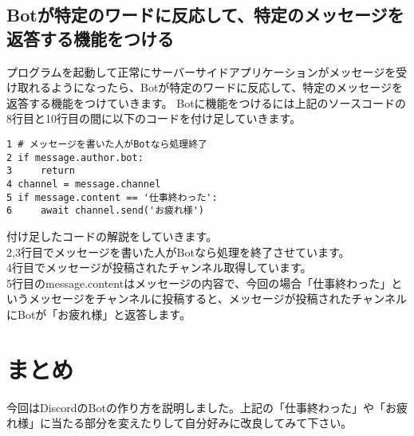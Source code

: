\subsection{Botが特定のワードに反応して、特定のメッセージを返答する機能をつける}
プログラムを起動して正常にサーバーサイドアプリケーションがメッセージを受け取れるようになったら、Botが特定のワードに反応して、特定のメッセージを返答する機能をつけていきます。
Botに機能をつけるには上記のソースコードの8行目と10行目の間に以下のコードを付け足していきます。\\
\begin{tcolorbox}[breakable]
\begin{verbatim}
1 # メッセージを書いた人がBotなら処理終了
2 if message.author.bot:
3     return
4 channel = message.channel 
5 if message.content == '仕事終わった':
6     await channel.send('お疲れ様')
\end{verbatim}
\end{tcolorbox}
付け足したコードの解説をしていきます。\\
2,3行目でメッセージを書いた人がBotなら処理を終了させています。\\
4行目でメッセージが投稿されたチャンネル取得しています。\\
5行目のmessage.contentはメッセージの内容で、今回の場合「仕事終わった」というメッセージをチャンネルに投稿すると、メッセージが投稿されたチャンネルにBotが「お疲れ様」と返答します。
\section{まとめ}
今回はDiscordのBotの作り方を説明しました。上記の「仕事終わった」や「お疲れ様」に当たる部分を変えたりして自分好みに改良してみて下さい。